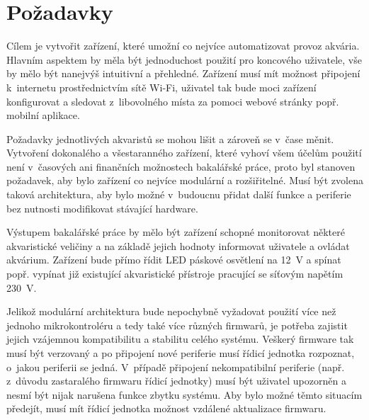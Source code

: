 \section{Požadavky}
\label{sec:pozadavky}
    Cílem je vytvořit zařízení, které umožní co nejvíce automatizovat provoz akvária. Hlavním aspektem by měla být jednoduchost použití pro koncového uživatele, vše by mělo být nanejvýš intuitivní a přehledné. Zařízení musí mít možnost připojení k~internetu prostřednictvím sítě Wi-Fi, uživatel tak bude moci zařízení konfigurovat a sledovat z~libovolného místa za pomoci webové stránky popř. mobilní aplikace.

    Požadavky jednotlivých akvaristů se mohou lišit a zároveň se v~čase měnit. Vytvoření dokonalého a všestaranného zařízení, které vyhoví všem účelům použití není v~časových ani finančních možnostech bakalářské práce, proto byl stanoven požadavek, aby bylo zařízení co nejvíce modulární a rozšiřitelné. Musí být zvolena taková architektura, aby bylo možné v~budoucnu přidat další funkce a periferie bez nutnosti modifikovat stávající hardware.

    Výstupem bakalářské práce by mělo být zařízení schopné monitorovat některé akvaristické veličiny a na základě jejich hodnoty informovat uživatele a ovládat akvárium. Zařízení bude přímo řídit LED páskové osvětlení na \qty{12}{V} a spínat popř. vypínat již existující akvaristické přístroje pracující se síťovým napětím \qty{230}{V}.  

    Jelikož modulární architektura bude nepochybně vyžadovat použití více než jednoho mikrokontroléru a tedy také více různých firmwarů, je potřeba zajistit jejich vzájemnou kompatibilitu a stabilitu celého systému. Veškerý firmware tak musí být verzovaný a po připojení nové periferie musí řídicí jednotka rozpoznat, o~jakou periferii se jedná. V~případě připojení nekompatibilní periferie (např. z~důvodu zastaralého firmwaru řídicí jednotky) musí být uživatel upozorněn a nesmí být nijak narušena funkce zbytku systému. Aby bylo možné těmto situacím předejít, musí mít řídicí jednotka možnost vzdálené aktualizace firmwaru.